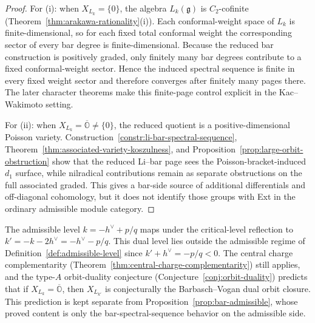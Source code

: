 \begin{proof}
For (i): when $X_{L_k} = \{0\}$, the algebra $L_k(\mathfrak{g})$
is $C_2$-cofinite (Theorem~\ref{thm:arakawa-rationality}(i)).
Each conformal-weight space of $L_k$ is finite-dimensional, so
for each fixed total conformal weight the corresponding sector of
every bar degree is finite-dimensional. Because the reduced bar
construction is positively graded, only finitely many bar degrees
contribute to a fixed conformal-weight sector. Hence the induced
spectral sequence is finite in every fixed weight sector and
therefore converges after finitely many pages there. The later
character theorems make this finite-page control explicit in the
Kac--Wakimoto setting.

For (ii): when $X_{L_k} = \overline{\mathbb{O}} \neq \{0\}$,
the reduced quotient is a positive-dimensional Poisson variety.
Construction~\ref{constr:li-bar-spectral-sequence},
Theorem~\ref{thm:associated-variety-koszulness}, and
Proposition~\ref{prop:large-orbit-obstruction} show that the
reduced Li--bar page sees the Poisson-bracket-induced $d_1$
surface, while nilradical contributions remain as separate
obstructions on the full associated graded. This gives a
bar-side source of additional differentials and off-diagonal
cohomology, but it does not identify those groups with Ext in the
ordinary admissible module category.
\end{proof}

\begin{remark}
\label{rem:bar-admissible-dual-level}
The admissible level $k = -h^\vee + p/q$ maps under the
critical-level reflection to
$k' = -k - 2h^\vee = -h^\vee - p/q$. This dual level lies
outside the admissible regime of
Definition~\ref{def:admissible-level} since $k' + h^\vee = -p/q<0$.
The central charge complementarity
\textup{(}Theorem~\textup{\ref{thm:central-charge-complementarity}}\textup{)}
still applies, and the type-$A$ orbit-duality conjecture
\textup{(}Conjecture~\textup{\ref{conj:orbit-duality}}\textup{)}
predicts that if $X_{L_k}=\overline{\mathbb{O}}$, then
$X_{L_{k'}}$ is conjecturally the Barbasch--Vogan dual orbit closure.
This prediction is kept separate from
Proposition~\ref{prop:bar-admissible}, whose proved content is only
the bar-spectral-sequence behavior on the admissible side.
\end{remark}

